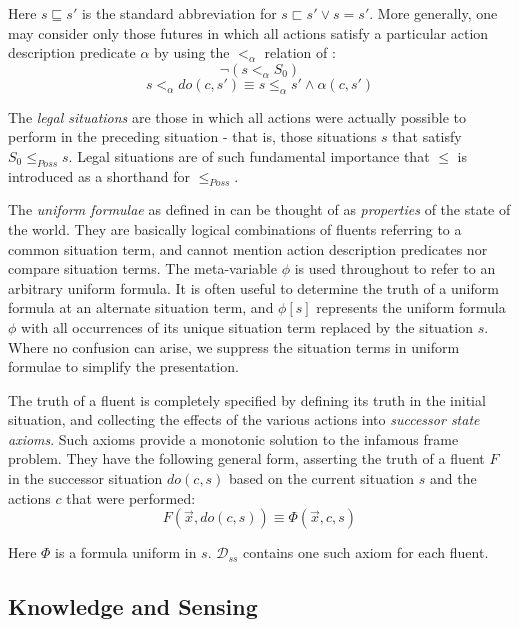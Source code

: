 \documentclass{ifaamas-submission}
\begin{document}
Here $s\sqsubseteq s'$ is the standard abbreviation for $s\sqsubset s'\vee s=s'$.
More generally, one may consider only those futures in which all actions
satisfy a particular action description predicate $\alpha$ by using
the $<_{\alpha}$ relation of \cite{kelly07sc_persistence}:\[
\neg\left(s<_{\alpha}S_{0}\right)\]
\[
s<_{\alpha}do(c,s')\equiv s\leq_{\alpha}s'\wedge\alpha(c,s')\]


The \emph{legal situations} are those in which all actions were actually
possible to perform in the preceding situation - that is, those situations
$s$ that satisfy $S_{0}\leq_{Poss}s$. Legal situations are of such
fundamental importance that $\leq$ is introduced as a shorthand for
$\leq_{Poss}$.

The \emph{uniform formulae} as defined in \cite{pirri99contributions_sitcalc}
can be thought of as \emph{properties} of the state of the world.
They are basically logical combinations of fluents referring to a
common situation term, and cannot mention action description predicates
nor compare situation terms. The meta-variable $\phi$ is used throughout
to refer to an arbitrary uniform formula. It is often useful to determine
the truth of a uniform formula at an alternate situation term, and
$\phi[s]$ represents the uniform formula $\phi$ with all occurrences
of its unique situation term replaced by the situation $s$. Where
no confusion can arise, we suppress the situation terms in uniform
formulae to simplify the presentation.

The truth of a fluent is completely specified by defining its truth
in the initial situation, and collecting the effects of the various
actions into \emph{successor state axioms}. Such axioms provide a
monotonic solution to the infamous frame problem. They have the following
general form, asserting the truth of a fluent $F$ in the successor
situation $do(c,s)$ based on the current situation $s$ and the actions
$c$ that were performed: \[
F(\overrightarrow{x},do(c,s))\equiv\Phi(\overrightarrow{x},c,s)\]


Here $\Phi$ is a formula uniform in $s$. $\mathcal{D}_{ss}$ contains
one such axiom for each fluent.


\subsection{Knowledge and Sensing}
\end{document}
